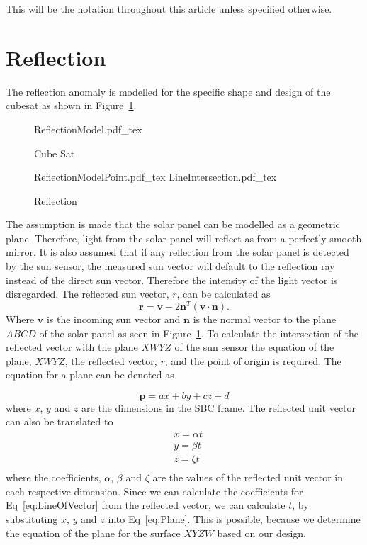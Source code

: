 \documentclass[letterpaper, 10 pt, conference]{ieeeconf}  %
\begin{document}
This will be the notation throughout this article unless specified otherwise. 

\section{Reflection}
\label{section:Reflection}
The reflection anomaly is modelled for the specific shape and design of the cubesat as shown in Figure~\ref{fig:CubeSat}.

\begin{figure}[!htb]
	\centering
	\def\svgwidth{7cm}
	{ReflectionModel.pdf_tex}
	\caption{Cube Sat}
	\label{fig:CubeSat}
\end{figure}

\begin{figure*}[!hbt]
	\centering
	\def\svgwidth{7cm}
	{ReflectionModelPoint.pdf_tex}
	\centering
	\def\svgwidth{7cm}
	{LineIntersection.pdf_tex}
	\caption{Reflection}
	\label{fig:LineIntersection}
\end{figure*}

The assumption is made that the solar panel can be modelled as a geometric plane. Therefore, light from the solar panel will reflect as from a perfectly smooth mirror. It is also assumed that if any reflection from the solar panel is detected by the sun sensor, the measured sun vector will default to the reflection ray instead of the direct sun vector. Therefore the intensity of the light vector is disregarded. The reflected sun vector, $r$, can be calculated as
\begin{equation}
	\mathbf{r} = \mathbf{v} - 2\mathbf{n}^T(\mathbf{v} \cdot \mathbf{n}).
\end{equation}
Where $\mathbf{v}$ is the incoming sun vector and $\mathbf{n}$ is the normal vector to the plane $ABCD$ of the solar panel as seen in Figure~\ref{fig:CubeSat}. To calculate the intersection of the reflected vector with the plane $XWYZ$ of the sun sensor the equation of the plane, $XWYZ$, the reflected vector, $r$, and the point of origin is required. The equation for a plane can be denoted as 

\begin{equation}
	\mathbf{p} = ax + by + cz + d
	\label{eq:Plane}
\end{equation}
where $x$, $y$ and $z$ are the dimensions in the SBC frame. The reflected unit vector can also be translated to 
\begin{equation}
	\begin{aligned}
	&	x = \alpha t \\
	&	y = \beta t \\
	&	z = \zeta t \\
	\end{aligned}
\label{eq:LineOfVector}
\end{equation}
where the coefficients, $\alpha$, $\beta$ and $\zeta$ are the values of the reflected unit vector in each respective dimension. Since we can calculate the coefficients for Eq~\ref{eq:LineOfVector} from the reflected vector, we can calculate $t$, by substituting $x$, $y$ and $z$ into Eq~\ref{eq:Plane}. This is possible, because we determine the equation of the plane for the surface $XYZW$ based on our design. 
\end{document}
